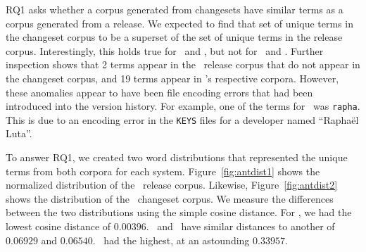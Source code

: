 RQ1 asks whether a corpus generated from changesets have similar terms
as a corpus generated from a release.
We expected to find that set of unique terms in the changeset corpus to be
a superset of the set of unique terms in the release corpus.
Interestingly, this holds true for \jodatime\ and \aspectj,
but not for \ant\ and \postgres.
Further inspection shows that 2 terms appear in the \ant\ release corpus that do not appear in the changeset corpus,
and 19 terms appear in \postgres's respective corpora.
However, these anomalies appear to have been file encoding errors that
had been introduced into the version history.
For example, one of the terms for \ant\ was \texttt{rapha}. This is due
to an encoding error in the \texttt{KEYS} files for a developer named
``Rapha\"{e}l Luta''.

To answer RQ1, we created two word distributions that represented the unique
terms from both corpora for each system.
Figure~\ref{fig:antdist1} shows the normalized distribution of the \ant\ release corpus.
Likewise, Figure~\ref{fig:antdist2} shows the distribution of the \ant\ changeset corpus.
We measure the differences between the two distributions using the simple
cosine distance. For \ant, we had the lowest cosine distance of $0.00396$.
\aspectj\ and \jodatime\ have similar distances to another of $0.06929$ and
$0.06540$. \postgres\ had the highest, at an astounding $0.33957$.

%
%

